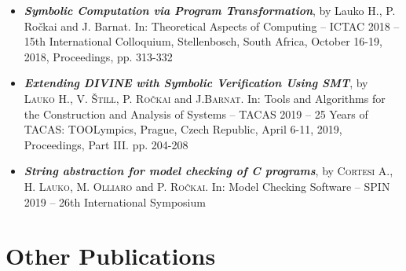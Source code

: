 \begin{itemize}

\item \textbf{\emph{Symbolic Computation via Program Transformation}}, by Lauko
H., P. Ročkai and J. Barnat.  In: Theoretical Aspects of Computing -- ICTAC 2018 --
15th International Colloquium, Stellenbosch, South Africa, October 16-19, 2018,
Proceedings, pp. 313-332~\cite{Lauko2018SymComp}


\item \emph{\textbf{Extending \textsf{DIVINE} with Symbolic Verification Using SMT}},
by \textsc{Lauko} H., V. \textsc{Štill}, P. \textsc{Ročkai} and J.\textsc{Barnat}.
In: Tools and Algorithms for the Construction and Analysis of Systems -- TACAS 2019 --
25 Years of TACAS: TOOLympics, Prague, Czech Republic, April 6-11, 2019,
Proceedings, Part III. pp. 204-208~\cite{Lauko2019Sym}


\item \textbf{\emph{String abstraction for model checking of C programs}},
by \textsc{Cortesi} A., H. \textsc{Lauko}, M. \textsc{Olliaro} and P. \textsc{Ročkai}.
In: Model Checking Software -- SPIN 2019 -- 26th International Symposium



\end{itemize}

\section{Other Publications}

